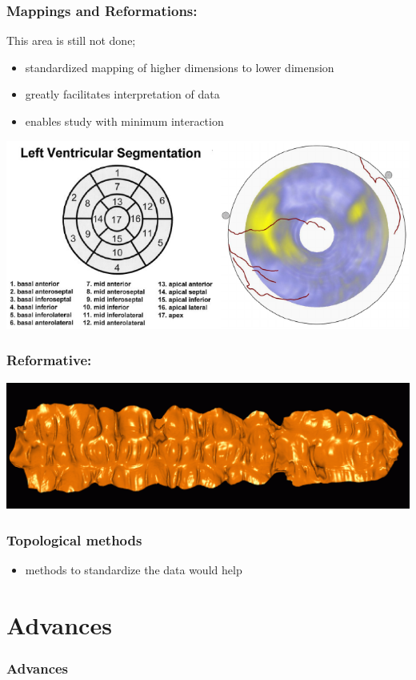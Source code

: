 \documentclass{beamer}
\begin{document}
\begin{frame}
	\frametitle{Mappings and Reformations:}
		This area is still not done;
	\begin{itemize}
		\item standardized mapping of higher dimensions to lower dimension
		\item greatly facilitates interpretation of data
		\item enables study with minimum interaction
	\end{itemize}
	\includegraphics[width=\textwidth]{images/heart}
\end{frame}

\begin{frame}
	\frametitle{Reformative:} %
	\includegraphics[width=\textwidth]{images/colon}
\end{frame}

\begin{frame}
	\frametitle{Topological methods}
	\begin{itemize}
		\item methods to standardize the data would help
	\end{itemize}
\end{frame}


\section{Advances}

\begin{frame}
	\frametitle{Advances}
\end{frame}
\end{document}
